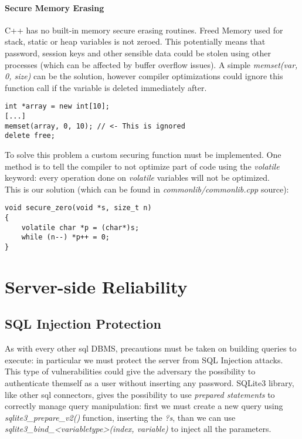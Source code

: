 \paragraph{Secure Memory Erasing}
C++ has no built-in memory secure erasing routines. Freed Memory used for stack, static or heap variables is not zeroed. This potentially means that password, session keys and other sensible data could be stolen using other processes (which can be affected by buffer overflow issues). A simple \textit{memset(var, 0, size)} can be the solution, however compiler optimizations could ignore this function call if the variable is deleted immediately after.
\begin{lstlisting}
int *array = new int[10];
[...]
memset(array, 0, 10); // <- This is ignored
delete free;
\end{lstlisting}
To solve this problem a custom securing function must be implemented. One method is to tell the compiler to not optimize part of code using the \textit{volatile} keyword: every operation done on \textit{volatile} variables will not be optimized.
\\
This is our solution (which can be found in \textit{commonlib/commonlib.cpp} source):
\begin{lstlisting}
void secure_zero(void *s, size_t n)
{
	volatile char *p = (char*)s;
	while (n--) *p++ = 0;
}
\end{lstlisting}


\section{Server-side Reliability}
\subsection{SQL Injection Protection}
As with every other sql DBMS, precautions must be taken on building queries to execute: in particular we must protect the server from SQL Injection attacks. This type of vulnerabilities could give the adversary the possibility to authenticate themself as a user without inserting any password. SQLite3 library, like other sql connectors, gives the possibility to use \textit{prepared statements} to correctly manage query manipulation: first we must create a new query using \textit{sqlite3\_prepare\_v2()} function, inserting the \textit{?s}, than we can use \textit{sqlite3\_bind\_<variabletype>(index, variable)} to inject all the parameters.

